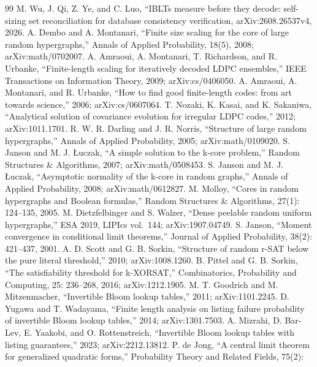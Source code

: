 \begin{thebibliography}{99}
 M. Wu, J. Qi, Z. Ye, and C. Luo, ``IBLTs measure
before they decode: self-sizing set reconciliation for database
consistency verification, arXiv:2608.26537v4, 2026.
 A. Dembo and A. Montanari, ``Finite size scaling for the
core of large random hypergraphs,'' Annals of Applied Probability,
18(5), 2008; arXiv:math/0702007.
 A. Amraoui, A. Montanari, T. Richardson, and R.
Urbanke,
``Finite-length scaling for iteratively decoded LDPC ensembles,''
IEEE Transactions on Information Theory, 2009; arXiv:cs/0406050.
 A. Amraoui, A. Montanari, and R. Urbanke, ``How to
find good finite-length codes: from art towards science,'' 2006;
arXiv:cs/0607064.
 T. Nozaki, K. Kasai, and K. Sakaniwa, ``Analytical
solution of covariance evolution for irregular LDPC codes,'' 2012;
arXiv:1011.1701.
 R. W. R. Darling and J. R. Norris, ``Structure of large
random hypergraphs,'' Annals of Applied Probability, 2005;
arXiv:math/0109020.
 S. Janson and M. J. Łuczak, ``A simple solution to the
k-core problem,'' Random Structures \& Algorithms, 2007;
arXiv:math/0508453.
 S. Janson and M. J. Łuczak, ``Asymptotic normality of the
k-core in random graphs,'' Annals of Applied Probability, 2008;
arXiv:math/0612827.
 M. Molloy, ``Cores in random hypergraphs and Boolean
formulas,'' Random Structures \& Algorithms, 27(1): 124--135, 2005.
 M. Dietzfelbinger and S. Walzer, ``Dense peelable random
uniform hypergraphs,'' ESA 2019, LIPIcs vol.~144; arXiv:1907.04749.
 S. Janson, ``Moment convergence in conditional
limit theorems,'' Journal of Applied Probability, 38(2): 421--437,
2001.
 A. D. Scott and G. B. Sorkin, ``Structure of random r-SAT
below the pure literal threshold,'' 2010; arXiv:1008.1260.
 B. Pittel and G. B. Sorkin, ``The satisfiability
threshold for k-XORSAT,'' Combinatorics, Probability and Computing,
25:
 236--268, 2016; arXiv:1212.1905.
 M. T. Goodrich and M. Mitzenmacher, ``Invertible Bloom
lookup tables,'' 2011; arXiv:1101.2245.
 D. Yugawa and T. Wadayama, ``Finite length analysis on
listing failure probability of invertible Bloom lookup tables,'' 2014;
arXiv:1301.7503.
 A. Mizrahi, D. Bar-Lev, E. Yaakobi, and O.
Rottenstreich, ``Invertible Bloom lookup tables with listing
guarantees,'' 2023; arXiv:2212.13812.
 P. de Jong, ``A central limit theorem for generalized
quadratic forms,'' Probability Theory and Related Fields, 75(2):

\end{thebibliography}

